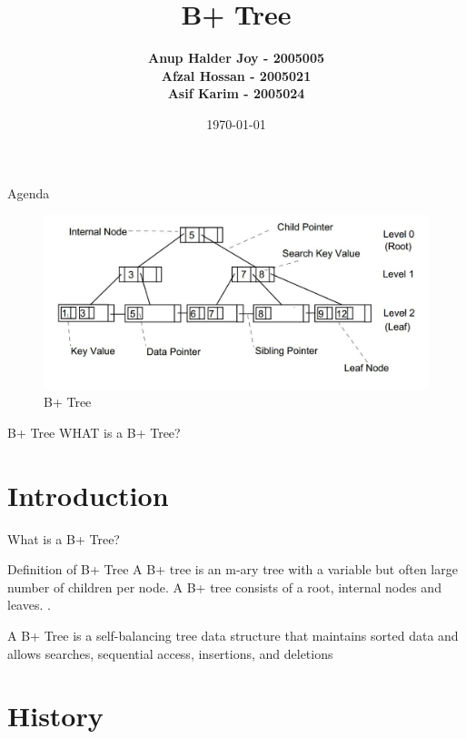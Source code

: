 \documentclass{beamer}
\title{\textbf{B+ Tree}}
\author[Anup \and  Afzal \and Asif]{\textbf{Anup Halder Joy - 2005005\\Afzal Hossan - 2005021\\Asif Karim - 2005024} }
\date{\today}
\begin{document}
\frame{\titlepage}
\begin{frame}{Agenda}
  \tableofcontents
\end{frame}
\begin{frame}{}
    \begin{figure}
        \centering
        \includegraphics[scale=0.4]{Images/B+tree.jpg}
        \caption{B+ Tree}
    \end{figure}
\end{frame}

\begin{frame}{B+ Tree}
    \centering
    {\huge\alert{WHAT} is a B+ Tree?}
\end{frame}

\section{Introduction}

\begin{frame}{What is a B+ Tree?}
    \begin{block}{Definition of B+ Tree} 
        A B+ tree is an m-ary tree with a variable but often large number of children per node. A B+ tree consists of a root, internal nodes and leaves. \cite{navathe2010fundamentals}.
    \end{block}
    \begin{block}{}
         A \alert{B+ Tree} is a self-balancing tree data structure that maintains sorted data and allows searches, sequential access, insertions, and deletions
    \end{block}
\end{frame}

\section{History}
\end{document}
